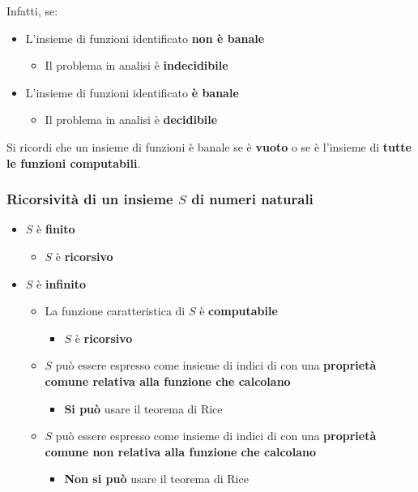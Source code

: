 \documentclass[italian, 10pt]{article}
\begin{document}
Infatti, se:

\begin{itemize}
  \item L'insieme di funzioni identificato \textbf{non è banale}
        \begin{itemize}[label=\(\Rightarrow\)]
          \item Il problema in analisi è \textbf{indecidibile}
        \end{itemize}
  \item L'insieme di funzioni identificato \textbf{è banale}
        \begin{itemize}[label=\(\Rightarrow\)]
          \item Il problema in analisi è \textbf{decidibile}
        \end{itemize}
\end{itemize}

Si ricordi che un insieme di funzioni è banale se è \textbf{vuoto} o se è l'insieme di \textbf{tutte le funzioni computabili}.

\subsubsection[Ricorsività di un insieme S di numeri naturali]{Ricorsività di un insieme \(S\) di numeri naturali}

\begin{itemize}
  \item \(S\) è \textbf{finito}
        \begin{itemize}[label=\(\Rightarrow\)]
          \item \(S\) è \textbf{ricorsivo}
        \end{itemize}
  \item \(S\) è \textbf{infinito}
        \begin{itemize}
          \item La funzione caratteristica di \(S\) è \textbf{computabile}
                \begin{itemize}[label=\(\Rightarrow\)]
                  \item \(S\) è \textbf{ricorsivo}
                \end{itemize}
          \item \(S\) può essere espresso come insieme di indici di \TM con una \textbf{proprietà comune relativa alla funzione che calcolano}
                \begin{itemize}[label=\(\Rightarrow\)]
                  \item \textbf{Si può} usare il teorema di Rice
                \end{itemize}
          \item \(S\) può essere espresso come insieme di indici di \TM con una \textbf{proprietà comune non relativa alla funzione che calcolano}
                \begin{itemize}[label=\(\Rightarrow\)]
                  \item \textbf{Non si può} usare il teorema di Rice
                \end{itemize}
        \end{itemize}
\end{itemize}
\end{document}
